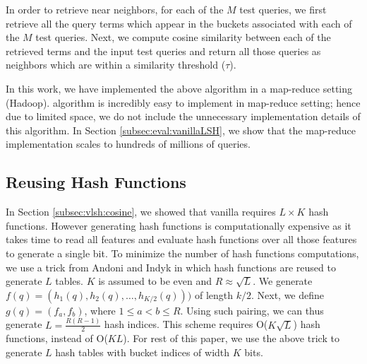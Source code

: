 In order to retrieve near neighbors, for each of the $M$ test queries, we first 
retrieve all the query terms which appear in the buckets associated with each of the $M$ test queries. 
Next, we compute cosine similarity between each of the retrieved terms 
and the input test queries and return all those queries as neighbors 
which are within a similarity threshold ($\tau$). 

In this work, we have implemented the above algorithm in a map-reduce setting (Hadoop). 
\lsh algorithm is incredibly easy to implement in map-reduce setting; hence due to limited space, 
we do not include the unnecessary implementation details of this algorithm.  
In Section \ref{subsec:eval:vanillaLSH}, we show that the map-reduce implementation scales to hundreds of millions of queries.  

\subsection{Reusing Hash Functions}
\label{subsec:resuseHash}
In Section \ref{subsec:vlsh:cosine}, we showed that vanilla \lsh requires $L\times K$ hash functions. 
However generating hash functions is computationally expensive as 
it takes time to read all features and 
evaluate hash functions over all those features to generate a single bit. 
To minimize the number of hash functions computations, 
we use a trick from Andoni and Indyk  
in which hash functions are reused to generate $L$ tables. $K$ is assumed to be even and $R \approx	\sqrt L$. 
We generate $f(q)=(h_1(q),h_2(q),\dots,h_{K/2}(q)))$ of length $k/2$. 
Next, we define $g(q)=(f_a,f_b)$, where $1\leq a < b \leq R$. Using such pairing, we
can thus generate $L= \frac{R (R -1)}{2}$ hash indices. 
This scheme requires O($K  \sqrt L$) hash functions, instead of O($KL$).    
For rest of this paper, we use the above trick to generate $L$ hash tables with bucket indices of width $K$ bits.  

